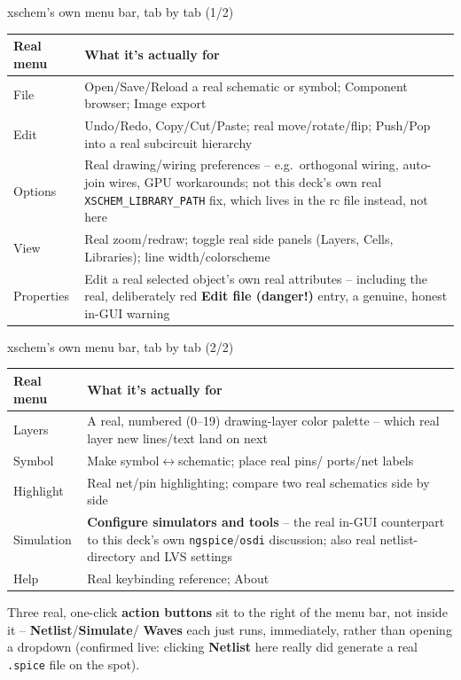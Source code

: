 \documentclass[aspectratio=169]{beamer}
\begin{document}
\begin{frame}[fragile]{xschem's own menu bar, tab by tab (1/2)}
\footnotesize
\begin{center}
\begin{tabularx}{\textwidth}{@{}p{}X@{}}
\toprule
Real menu & What it's actually for \\
\midrule
File & Open/Save/Reload a real schematic or symbol; Component
       browser; Image export \\
Edit & Undo/Redo, Copy/Cut/Paste; real move/rotate/flip; Push/Pop
       into a real subcircuit hierarchy \\
Options & Real drawing/wiring preferences -- e.g.\ orthogonal
           wiring, auto-join wires, GPU workarounds; not this
           deck's own real \texttt{XSCHEM\_LIBRARY\_PATH} fix, which
           lives in the rc file instead, not here \\
View & Real zoom/redraw; toggle real side panels (Layers, Cells,
       Libraries); line width/colorscheme \\
Properties & Edit a real selected object's own real attributes --
              including the real, deliberately red
              \textbf{Edit file (danger!)} entry, a genuine, honest
              in-GUI warning \\
\bottomrule
\end{tabularx}
\end{center}
\normalsize
\end{frame}

\begin{frame}[fragile]{xschem's own menu bar, tab by tab (2/2)}
\footnotesize
\begin{center}
\begin{tabularx}{\textwidth}{@{}p{}X@{}}
\toprule
Real menu & What it's actually for \\
\midrule
Layers & A real, numbered (0--19) drawing-layer color palette --
          which real layer new lines/text land on next \\
Symbol & Make symbol$\leftrightarrow$schematic; place real pins/
         ports/net labels \\
Highlight & Real net/pin highlighting; compare two real schematics
            side by side \\
Simulation & \textbf{Configure simulators and tools} -- the real
              in-GUI counterpart to this deck's own
              \texttt{ngspice}/\texttt{osdi} discussion; also
              real netlist-directory and LVS settings \\
Help & Real keybinding reference; About \\
\bottomrule
\end{tabularx}
\end{center}
\normalsize
Three real, one-click \textbf{action buttons} sit to the right of the
menu bar, not inside it -- \textbf{Netlist}/\textbf{Simulate}/
\textbf{Waves} each just runs, immediately, rather than opening a
dropdown (confirmed live: clicking \textbf{Netlist} here really did
generate a real \texttt{.spice} file on the spot).
\end{frame}
\end{document}
